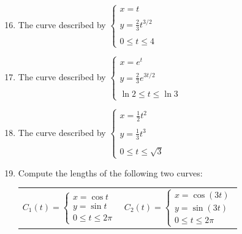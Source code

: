 \documentclass[12pt]{article}
\newif\ifans
\begin{document}

\begin{enumerate}
\setcounter{enumi}{15}

\item The curve described by $\left\{\begin{array}{l}
x=t\\
\\
y=\frac{2}{3}t^{3/2}\\
\\
0 \leq t \leq 4 \end{array}\right.$

\ifans{\fbox{$-\frac{2}{3}+\frac{10\sqrt{5}}{3}$}} \fi

\item The curve described by $\left\{\begin{array}{l}
x=e^t\\
\\
y=\frac{2}{3}e^{3t/2}\\
\\
\ln{2} \leq t \leq \ln{3} \end{array}\right.$

\ifans{\fbox{$-2\sqrt{3}+\frac{16}{3}$}} \fi

\item The curve described by $\left\{\begin{array}{l}
x=\frac{1}{2}t^2\\
\\
y=\frac{1}{3}t^3\\
\\
0 \leq t \leq \sqrt{3} \end{array} \right.$

\ifans{\fbox{$\frac{7}{3}$}} \fi

\item Compute the lengths of the following two curves:

\begin{center}
\begin{tabular}{cc}
$C_1(t)=\left\{\begin{array}{l}
x=\cos{t}\\
y=\sin{t}\\
0 \leq t \leq 2\pi \end{array} \right.$ \hspace{0.5 cm}& \hspace{0.5 cm}
$C_2(t)=\left\{\begin{array}{l}
x=\cos{(3t)}\\
y=\sin{(3t)}\\
0 \leq t \leq 2\pi \end{array} \right.$
\end{tabular}
\end{center}


\end{enumerate}
\end{document}
